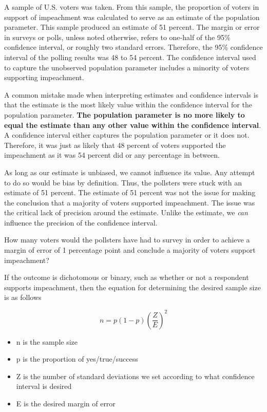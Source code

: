 \documentclass[
]{book}
\providecommand{\tightlist}{%
  \setlength{\itemsep}{0pt}\setlength{\parskip}{0pt}}
\begin{document}
A sample of U.S. voters was taken. From this sample, the proportion of voters in support of impeachment was calculated to serve as an estimate of the population parameter. This sample produced an estimate of 51 percent. The margin or error in surveys or polls, unless noted otherwise, refers to one-half of the 95\% confidence interval, or roughly two standard errors. Therefore, the 95\% confidence interval of the polling results was 48 to 54 percent. The confidence interval used to capture the unobserved population parameter includes a minority of voters supporting impeachment.

A common mistake made when interpreting estimates and confidence intervals is that the estimate is the most likely value within the confidence interval for the population parameter. \textbf{The population parameter is no more likely to equal the estimate than any other value within the confidence interval}. A confidence interval either captures the population parameter or it does not. Therefore, it was just as likely that 48 percent of voters supported the impeachment as it was 54 percent did or any percentage in between.

As long as our estimate is unbiased, we cannot influence its value. Any attempt to do so would be bias by definition. Thus, the pollsters were stuck with an estimate of 51 percent. The estimate of 51 percent was not the issue for making the conclusion that a majority of voters supported impeachment. The issue was the critical lack of precision around the estimate. Unlike the estimate, we \emph{can} influence the precision of the confidence interval.

How many voters would the pollsters have had to survey in order to achieve a margin of error of 1 percentage point and conclude a majority of voters support impeachment?

If the outcome is dichotomous or binary, such as whether or not a respondent supports impeachment, then the equation for determining the desired sample size is as follows

\begin{equation}
n=p(1-p)({\frac{Z}{E}})^2
\label{eq:sampsizeprop}
\end{equation}

\begin{itemize}
\tightlist
\item
  n is the sample size
\item
  p is the proportion of yes/true/success
\item
  Z is the number of standard deviations we set according to what confidence interval is desired
\item
  E is the desired margin of error
\end{itemize}
\end{document}
